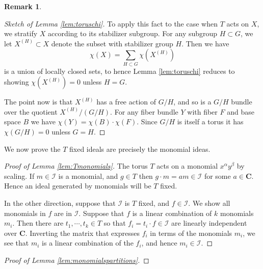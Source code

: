 \documentclass{amsart}[12pt]
\theoremstyle{definition}
\newtheorem{remark}[dummy]{Remark}
\newcommand{\C}{\mathbf{C}}
\newcommand{\II}{\mathcal{I}}
\begin{document}
\begin{remark}
\begin{proof}[Sketch of Lemma \ref{lem:toruschi}]

To apply this fact to the case when $T$ acts on $X$, we stratify $X$ according to its stabilizer subgroup.  For any subgroup $H\subset G$, we let $X^{(H)}\subset X$ denote the subset with stabilizer group $H$.  Then we have
\[\chi(X)=\sum_{H\subset G} \chi\left(X^{(H)}\right)\]
is a union of locally closed sets, to hence Lemma \ref{lem:toruschi} reduces to showing $\chi(X^{(H)})=0$ unless $H=G$.

The point now is that $X^{(H)}$ has a free action of $G/H$, and so is a $G/H$ bundle over the quotient $X^{(H)}/(G/H)$.  For any fiber bundle $Y$ with fiber $F$ and base space $B$ we have $\chi(Y)=\chi(B)\cdot \chi(F)$.  Since $G/H$ is itself a torus it has $\chi(G/H)=0$ unless $G=H$.  
\end{proof}


We now prove the $T$ fixed ideals are precisely the monomial ideas.
\begin{proof}[Proof of Lemma \ref{lem:Tmonomials}]
The torus $T$ acts on a monomial $x^\alpha y^\beta$ by scaling.  If $m\in \II$ is a monomial, and $g\in T$ then $g\cdot m=am\in \II$ for some $a\in \C$.  Hence an ideal generated by monomials will be $T$ fixed.  

In the other direction, suppose that $\II$ is $T$ fixed, and $f\in\II$.  We show all monomials in $f$ are in $\II$.  Suppose that $f$ is a linear combination of $k$ monomials $m_i$. Then there are $t_1,\cdots, t_k\in T$ so that $f_i=t_i \cdot f\in \II$ are linearly independent over $\C$. Inverting the matrix that expresses $f_i$ in terms of the monomials $m_i$, we see that $m_i$ is a linear combination of the $f_i$, and hence $m_i\in\II$.
\end{proof}



\begin{proof}[Proof of Lemma \ref{lem:monomialspartitions}]


\end{proof}
\end{remark}
\end{document}
